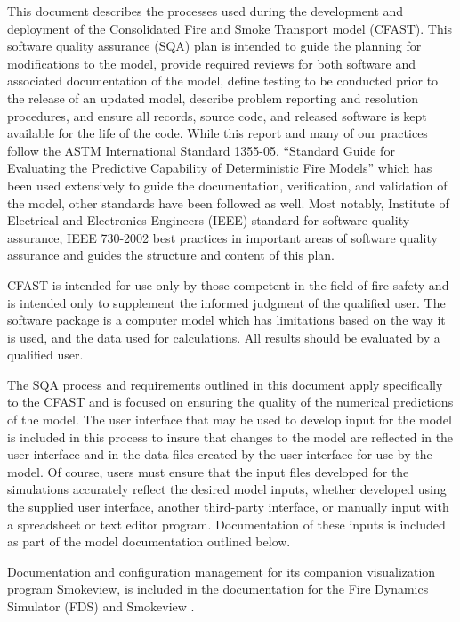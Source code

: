 \documentclass[12pt]{book}
\begin{document}
This document describes the processes used during the development and deployment of the Consolidated Fire and Smoke Transport model (CFAST).  This software quality assurance (SQA) plan is intended to guide the planning for modifications to the model, provide required reviews for both software and associated documentation of the model, define testing to be conducted prior to the release of an updated model, describe problem reporting and resolution procedures, and ensure all records, source code, and released software is kept available for the life of the code.  While this report and many of our practices follow the ASTM International Standard 1355-05, ``Standard Guide for Evaluating the Predictive Capability of Deterministic Fire Models'' \cite{ASTM:E1355} which has been used extensively to guide the documentation, verification, and validation of the model, other standards have been followed as well.  Most notably, Institute of Electrical and Electronics Engineers (IEEE) standard for software quality assurance, IEEE 730-2002 \cite{IEEE:730} best practices in important areas of software quality assurance and guides the structure and content of this plan.

CFAST is intended for use only by those competent in the field of fire safety and is intended only to supplement the informed judgment of the qualified user. The software package is a computer model which has limitations based on the way it is used, and the data used for calculations. All results should be evaluated by a qualified user.

The SQA process and requirements outlined in this document apply specifically to the CFAST and is focused on ensuring the quality of the numerical predictions of the model.  The user interface that may be used to develop input for the model is included in this process to insure that changes to the model are reflected in the user interface and in the data files created by the user interface for use by the model.  Of course, users must ensure that the input files developed for the simulations accurately reflect the desired model inputs, whether developed using the supplied user interface, another third-party interface, or manually input with a spreadsheet or text editor program.  Documentation of these inputs is included as part of the model documentation outlined below.

Documentation and configuration management for its companion visualization program Smokeview, is included in the documentation for the Fire Dynamics Simulator (FDS) and Smokeview \cite{FDS_Configuration_Guide_6}.
\end{document}
